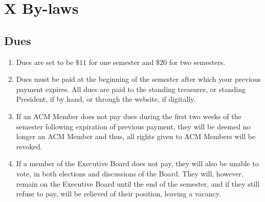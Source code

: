 \section{X \textendash{} By-laws}
\subsection{Dues}
\begin{enumerate}
  \item	Dues are set to be $\$11$ for one semester and $\$20$ for two semesters.
  \item	Dues must be paid at the beginning of the semester after which your
    previous payment expires. All dues are paid to the standing treasurer, or
    standing President, if by hand, or through the website, if digitally.
  \item If an ACM Member does not pay dues during the first two weeks of the
    semester following expiration of previous payment, they will be deemed no
    longer an ACM Member and thus, all rights given to ACM Members will be
    revoked.
  \item If a member of the Executive Board does not pay, they will also be
    unable to vote, in both elections and discussions of the Board. They will,
    however, remain on the Executive Board until the end of the semester, and if
    they still refuse to pay, will be relieved of their position, leaving a
    vacancy.
\end{enumerate}
